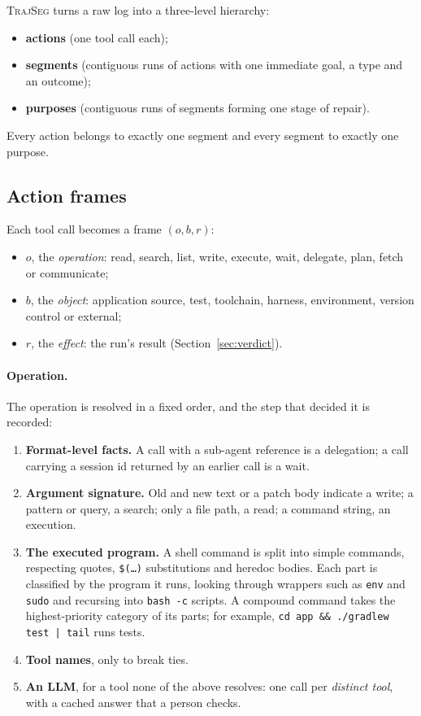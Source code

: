 \documentclass[sigconf,nonacm,10pt]{acmart}
\newcommand{\tool}{\textsc{TrajSeg}}   %
\newcommand{\code}[1]{\texttt{#1}}
\begin{document}
\tool{} turns a raw log into a three-level hierarchy:
\begin{itemize}
  \item \textbf{actions} (one tool call each);
  \item \textbf{segments} (contiguous runs of actions with one immediate goal, a
        type and an outcome);
  \item \textbf{purposes} (contiguous runs of segments forming one stage of repair).
\end{itemize}
Every action belongs to exactly one segment and every segment to exactly one purpose.

\subsection{Action frames}
\label{sec:frames}
Each tool call becomes a frame $(o, b, r)$:
\begin{itemize}
  \item $o$, the \emph{operation}: read, search, list, write, execute, wait,
        delegate, plan, fetch or communicate;
  \item $b$, the \emph{object}: application source, test, toolchain, harness,
        environment, version control or external;
  \item $r$, the \emph{effect}: the run's result (Section~\ref{sec:verdict}).
\end{itemize}

\paragraph{Operation.} The operation is resolved in a fixed order, and the step that
decided it is recorded:
\begin{enumerate}
  \item \textbf{Format-level facts.} A call with a sub-agent reference is a delegation;
        a call carrying a session id returned by an earlier call is a wait.
  \item \textbf{Argument signature.} Old and new text or a patch body indicate a write;
        a pattern or query, a search; only a file path, a read; a command string, an
        execution.
  \item \textbf{The executed program.} A shell command is split into simple commands,
        respecting quotes, \code{\$(\ldots)} substitutions and heredoc bodies.
        Each part is classified by the program it runs, looking through wrappers such
        as \code{env} and \code{sudo} and recursing into \code{bash -c} scripts. A
        compound command takes the highest-priority category of its parts; for
        example, \code{cd app \&\& ./gradlew test | tail} runs tests.
  \item \textbf{Tool names}, only to break ties.
  \item \textbf{An LLM}, for a tool none of the above resolves: one call per
        \emph{distinct tool}, with a cached answer that a person checks.
\end{enumerate}
\end{document}
